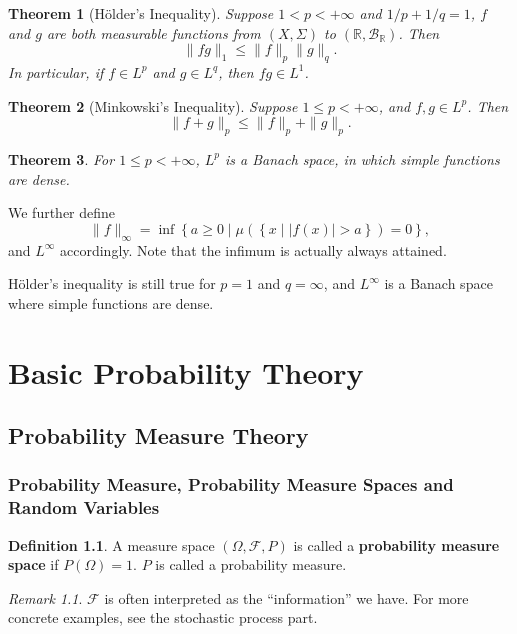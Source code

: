\documentclass[openany]{book}
\newtheorem{theorem}{Theorem}[chapter]
\theoremstyle{definition}
\newtheorem{definition}{Definition}[chapter]
\theoremstyle{remark}
\newtheorem*{remark}{Remark}
\begin{document}
\begin{theorem}[H\"{o}lder's Inequality]
    Suppose $1<p<+\infty$ and $1/p+1/q=1$, $f$ and $g$ are both measurable functions from $(X,\Sigma)$ to $(\mathbb{R},\mathcal{B}_{\mathbb{R}})$. Then
    \begin{equation*}
        \|fg\|_1\le\|f\|_p\|g\|_q.
    \end{equation*}
    In particular, if $f\in L^p$ and $g\in L^q$, then $fg\in L^1$.
\end{theorem}
\begin{theorem}[Minkowski's Inequality]
    Suppose $1\le p<+\infty$, and $f,g\in L^p$. Then
    \begin{equation*}
        \|f+g\|_p\le\|f\|_p+\|g\|_p.
    \end{equation*}
\end{theorem}
\begin{theorem}
    For $1\le p<+\infty$, $L^p$ is a Banach space, in which simple functions are dense.
\end{theorem}

We further define
\begin{equation*}
    \|f\|_{\infty}=\inf\left\{a\ge0\middle|\mu\left(\left\{x\middle||f(x)|>a\right\}\right)=0\right\},
\end{equation*}
and $L^{\infty}$ accordingly. Note that the infimum is actually always attained.

H\"{o}lder's inequality is still true for $p=1$ and $q=\infty$, and $L^{\infty}$ is a Banach space where simple functions are dense.

\part{Basic Probability Theory}
\chapter{Probability Measure Theory}
\section{Probability Measure, Probability Measure Spaces and Random Variables}
\begin{definition}
    A measure space $(\Omega,\mathcal{F},P)$ is called a \textbf{probability measure space} if $P(\Omega)=1$. $P$ is called a probability measure.
\end{definition}
\begin{remark}
    $\mathcal{F}$ is often interpreted as the ``information'' we have. For more concrete examples, see the stochastic process part.
\end{remark}
\end{document}
